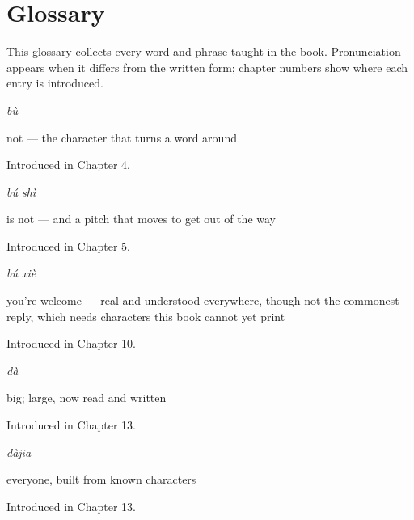 
\chapter*{Glossary}

This glossary collects every word and phrase taught in the book. Pronunciation appears when it differs from the written form; chapter numbers show where each entry is introduced.

\noindent\begin{minipage}[t]{\linewidth}
\raggedright
\textbf{}\enspace\emph{bù}\par
\small not — the character that turns a word around\par
\footnotesize Introduced in Chapter 4.
\end{minipage}\par\medskip

\noindent\begin{minipage}[t]{\linewidth}
\raggedright
\textbf{}\enspace\emph{bú shì}\par
\small is not — and a pitch that moves to get out of the way\par
\footnotesize Introduced in Chapter 5.
\end{minipage}\par\medskip

\noindent\begin{minipage}[t]{\linewidth}
\raggedright
\textbf{}\enspace\emph{bú xiè}\par
\small you're welcome — real and understood everywhere, though not the commonest reply, which needs characters this book cannot yet print\par
\footnotesize Introduced in Chapter 10.
\end{minipage}\par\medskip

\noindent\begin{minipage}[t]{\linewidth}
\raggedright
\textbf{}\enspace\emph{dà}\par
\small big; large, now read and written\par
\footnotesize Introduced in Chapter 13.
\end{minipage}\par\medskip

\noindent\begin{minipage}[t]{\linewidth}
\raggedright
\textbf{}\enspace\emph{dàjiā}\par
\small everyone, built from known characters\par
\footnotesize Introduced in Chapter 13.
\end{minipage}\par\medskip

